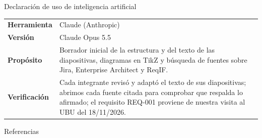 \documentclass[aspectratio=169,11pt]{beamer}
\begin{document}
\begin{frame}{Declaración de uso de inteligencia artificial}
  \small
  \begin{tabularx}{\textwidth}{>{\bfseries}l X}
    \toprule
    Herramienta  & Claude (Anthropic) \\
    Versión      & Claude Opus 5.5 \\
    Propósito    & Borrador inicial de la estructura y del texto de las
                   diapositivas, diagramas en TikZ y búsqueda de fuentes
                   sobre Jira, Enterprise Architect y ReqIF. \\
    Verificación & Cada integrante revisó y adaptó el texto de sus
                   diapositivas; abrimos cada fuente citada para comprobar
                   que respalda lo afirmado; el requisito REQ-001 proviene
                   de nuestra visita al UBU del 18/11/2026. \\
    \bottomrule
  \end{tabularx}
\end{frame}

\begin{frame}[allowframebreaks]{Referencias}
  \scriptsize
  
  
\end{frame}
\end{document}
